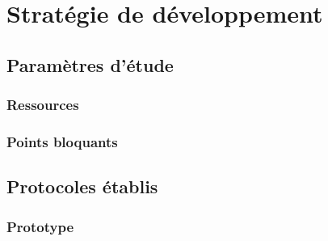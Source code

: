 \section{Stratégie de développement}

\subsection{Paramètres d'étude}

\subsubsection{Ressources}
\subsubsection{Points bloquants}

\subsection{Protocoles établis}

\subsubsection{Prototype}